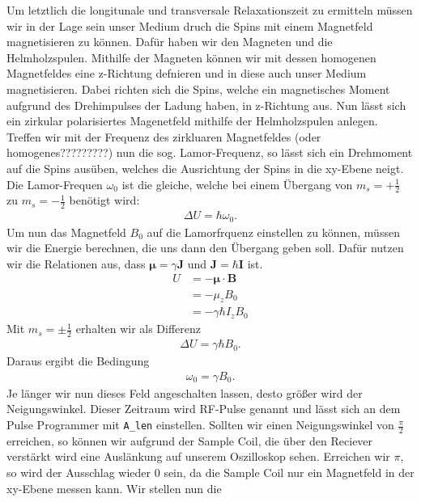 \documentclass[10pt]{article}
\begin{document}
\begin{multicols}{2}
  Um letztlich die longitunale und transversale Relaxationszeit zu ermitteln müssen wir in der Lage sein unser Medium druch die Spins mit einem Magnetfeld magnetisieren zu können. Dafür haben wir den Magneten und die Helmholzspulen. Mithilfe der Magneten können wir mit dessen homogenen Magnetfeldes eine z-Richtung defnieren und in diese auch unser Medium magnetisieren. Dabei richten sich die Spins, welche ein magnetisches Moment aufgrund des Drehimpulses der Ladung haben, in z-Richtung aus. Nun lässt sich ein zirkular polarisiertes Magenetfeld mithilfe der Helmholzspulen anlegen. Treffen wir mit der Frequenz des zirkluaren Magnetfeldes (oder homogenes?????????) nun die sog. Lamor-Frequenz, so lässt sich ein Drehmoment auf die Spins ausüben, welches die Ausrichtung der Spins in die xy-Ebene neigt. Die Lamor-Frequen $\omega_0$ ist die gleiche, welche bei einem Übergang von $m_s=+\frac{1}{2}$ zu $m_s=-\frac{1}{2}$ benötigt wird:
\begin{align}
  \Delta U = \hbar \omega_0.
\end{align}
Um nun das Magnetfeld $B_0$ auf die Lamorfrquenz einstellen zu können, müssen wir die Energie berechnen, die uns dann den Übergang geben soll. Dafür nutzen wir die Relationen aus, dass $\bm{\mu}=\gamma \bm{J}$ und $\bm{J}=\hbar\bm{I}$ ist.
\begin{align}
  U &= - \bm{\mu} \cdot \bm{B}\\
    &= - \mu_zB_0\\
    &= - \gamma\hbar I_z B_0
\end{align}
Mit $m_s=\pm \frac{1}{2}$ erhalten wir als Differenz 
\begin{align}
  \Delta U = \gamma \hbar B_0.
\end{align}
Daraus ergibt die Bedingung
\begin{align}
  \omega_0 = \gamma B_0.
\end{align}
  Je länger wir nun dieses Feld angeschalten lassen, desto größer wird der Neigungswinkel. Dieser Zeitraum wird RF-Pulse genannt und lässt sich an dem Pulse Programmer mit \texttt{A_len} einstellen. Sollten wir einen Neigungswinkel von $\frac{\pi}{2}$ erreichen, so können wir aufgrund der Sample Coil, die über den Reciever verstärkt wird eine Auslänkung auf unserem Oszilloskop sehen. Erreichen wir $\pi$, so wird der Ausschlag wieder 0 sein, da die Sample Coil nur ein Magnetfeld in der xy-Ebene messen kann. Wir stellen nun die %

 


\end{multicols}
\end{document}
